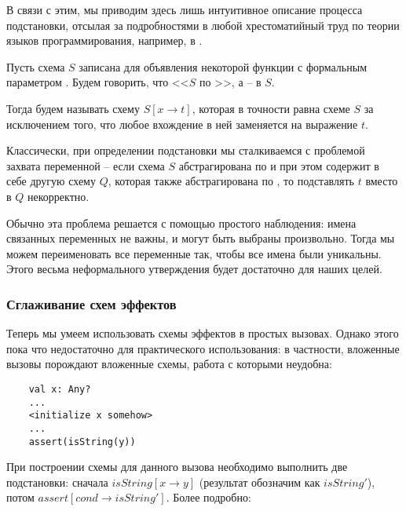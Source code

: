В связи с этим, мы приводим здесь лишь интуитивное описание процесса подстановки, отсылая за подробностями в любой хрестоматийный труд по теории языков программирования, например, в \cite{TAPL}.

\begin{definition}
     Пусть схема $S$ записана для объявления некоторой функции с формальным параметром . Будем говорить, что <<$S$  по >>, а  --  в $S$.
     
     Тогда  будем называть схему $S[x \to t]$, которая в точности равна схеме $S$ за исключением того, что любое вхождение  в ней заменяется на выражение $t$. 
\end{definition}

Классически, при определении подстановки мы сталкиваемся с проблемой захвата переменной -- если схема $S$ абстрагирована по  и при этом содержит в себе другую схему $Q$, которая также абстрагирована по , то подставлять $t$ вместо  в $Q$ некорректно. 

Обычно эта проблема решается с помощью простого наблюдения: имена связанных переменных не важны, и могут быть выбраны произвольно. Тогда мы можем переименовать все переменные так, чтобы все имена были уникальны. Этого весьма неформального утверждения будет достаточно для наших целей. 




\subsubsection{Сглаживание схем эффектов}

\label{section-flattening}

Теперь мы умеем использовать схемы эффектов в простых вызовах. Однако этого пока что недостаточно для практического использования: в частности, вложенные вызовы порождают вложенные схемы, работа с которыми неудобна:

\begin{verbatim}
    val x: Any?
    ...
    <initialize x somehow>
    ...
    assert(isString(y))
\end{verbatim}

При построении схемы для данного вызова необходимо выполнить две подстановки: сначала $isString[x \to y]$ (результат обозначим как $isString'$), потом $assert[cond \to isString']$. Более подробно:

